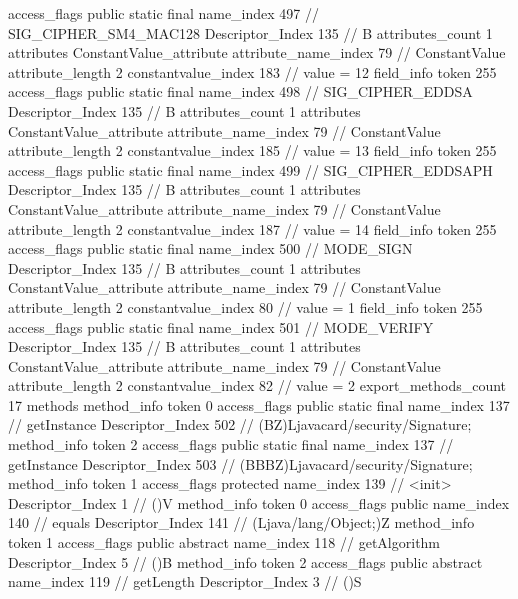 {{{{{				access_flags	public static final
				name_index	497		// SIG_CIPHER_SM4_MAC128
				Descriptor_Index	135		// B
				attributes_count	1
				attributes {
				ConstantValue_attribute {
					attribute_name_index	79		// ConstantValue
					attribute_length	2
					constantvalue_index	183		// value = 12
				}
				}
			}
			field_info {
				token	255
				access_flags	public static final
				name_index	498		// SIG_CIPHER_EDDSA
				Descriptor_Index	135		// B
				attributes_count	1
				attributes {
				ConstantValue_attribute {
					attribute_name_index	79		// ConstantValue
					attribute_length	2
					constantvalue_index	185		// value = 13
				}
				}
			}
			field_info {
				token	255
				access_flags	public static final
				name_index	499		// SIG_CIPHER_EDDSAPH
				Descriptor_Index	135		// B
				attributes_count	1
				attributes {
				ConstantValue_attribute {
					attribute_name_index	79		// ConstantValue
					attribute_length	2
					constantvalue_index	187		// value = 14
				}
				}
			}
			field_info {
				token	255
				access_flags	public static final
				name_index	500		// MODE_SIGN
				Descriptor_Index	135		// B
				attributes_count	1
				attributes {
				ConstantValue_attribute {
					attribute_name_index	79		// ConstantValue
					attribute_length	2
					constantvalue_index	80		// value = 1
				}
				}
			}
			field_info {
				token	255
				access_flags	public static final
				name_index	501		// MODE_VERIFY
				Descriptor_Index	135		// B
				attributes_count	1
				attributes {
				ConstantValue_attribute {
					attribute_name_index	79		// ConstantValue
					attribute_length	2
					constantvalue_index	82		// value = 2
				}
				}
			}
			}
			export_methods_count	17
			methods {
				method_info {
					token	0
					access_flags	public static final
					name_index	137		// getInstance
					Descriptor_Index	502		// (BZ)Ljavacard/security/Signature;
				}
				method_info {
					token	2
					access_flags	public static final
					name_index	137		// getInstance
					Descriptor_Index	503		// (BBBZ)Ljavacard/security/Signature;
				}
				method_info {
					token	1
					access_flags	protected
					name_index	139		// <init>
					Descriptor_Index	1		// ()V
				}
				method_info {
					token	0
					access_flags	public
					name_index	140		// equals
					Descriptor_Index	141		// (Ljava/lang/Object;)Z
				}
				method_info {
					token	1
					access_flags	public abstract
					name_index	118		// getAlgorithm
					Descriptor_Index	5		// ()B
				}
				method_info {
					token	2
					access_flags	public abstract
					name_index	119		// getLength
					Descriptor_Index	3		// ()S
}}}}}
